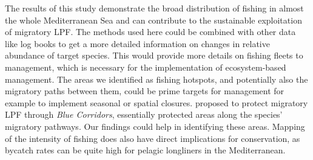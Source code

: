 \medskip

The results of this study demonstrate the broad distribution of fishing in almost the whole
Mediterranean Sea and can contribute to the sustainable exploitation of migratory LPF\@. The
methods used here could be combined with other data like log books to get a more detailed
information on changes in relative abundance of target species. This would provide more details on
fishing fleets to management, which is necessary for the implementation of ecosystem-based
management. The areas we identified as fishing hotspots, and potentially also the migratory paths
between them, could be prime targets for management for example to implement seasonal or spatial
closures. \cite{relano_pauly} proposed to protect migratory LPF through \textit{Blue Corridors},
essentially protected areas along the species' migratory pathways. Our findings could help in
identifying these areas. Mapping of the intensity of fishing does also have direct implications for
conservation, as bycatch rates can be quite high for pelagic longliners in the Mediterranean.